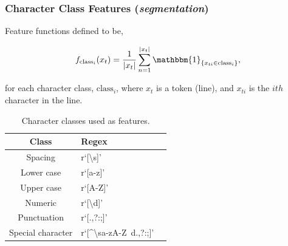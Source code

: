 \documentclass{beamer}
\begin{document}

\begin{frame}
\frametitle{Character Class Features (\emph{segmentation})}

Feature functions defined to be,

$$
f_{\text{class}_i}(x_t) = \frac{1}{|x_t|}\sum_{n=1}^{|x_t|} \mathbbm{1}_{\{x_{ti} \in \text{class}_i\}},
$$

for each character class, $\text{class}_i$, where $x_t$ is a token (line), and $x_{ti}$ is the $ith$ character in the line.

\begin{table}[h]
\begin{center}
\begin{tabular}{|c|l|l|}
\hline
Class & Regex\\
\hline
Spacing & r`[\textbackslash s]'\\
Lower case & r`[a-z]'\\
Upper case & r`[A-Z]'\\
Numeric & r`[\textbackslash d]'\\
Punctuation & r`[\(\).,?:;]'\\
Special character & r`[\^{}\textbackslash sa-zA-Z\ d\(\).,?:;]'\\
\hline
\end{tabular}
\caption[]{Character classes used as features.}
\end{center}
\end{table}

\end{frame}


\end{document}
